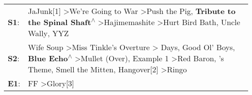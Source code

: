 \begin{supertabular}{p{0.03\textwidth}p{0.92\textwidth}}
 \textbf{S1}:  &                                                                                                                                                            JaJunk[1]\textsuperscript{} \textgreater \enspace We're Going to War\textsuperscript{} \textgreater \enspace Push the Pig\textsuperscript{}, \enspace \textbf{Tribute to the Spinal Shaft\textsuperscript{$\wedge$}} \textgreater \enspace Hajimemashite\textsuperscript{} \textgreater \enspace Hurt Bird Bath\textsuperscript{}, \enspace Uncle Wally\textsuperscript{}, \enspace YYZ\textsuperscript{}  \enspace  \\
 \textbf{S2}:  &  Wife Soup\textsuperscript{} \textgreater \enspace Miss Tinkle's Overture\textsuperscript{} \textgreater {} Days\textsuperscript{}, \enspace Good Ol' Boys\textsuperscript{}, \enspace \textbf{Blue Echo\textsuperscript{$\wedge$}} \textgreater \enspace Mullet (Over)\textsuperscript{}, \enspace Example 1\textsuperscript{} \textgreater \enspace Red Baron\textsuperscript{}, 's Theme\textsuperscript{}, \enspace Smell the Mitten\textsuperscript{}, \enspace Hangover[2]\textsuperscript{} \textgreater \enspace Ringo\textsuperscript{}  \enspace  \\
 \textbf{E1}:  &                                                                                                                                                                                                                                                                                                                                                                                                                                                                                                FF\textsuperscript{} \textgreater \enspace Glory[3]\textsuperscript{}  \enspace  \\
\end{supertabular}
